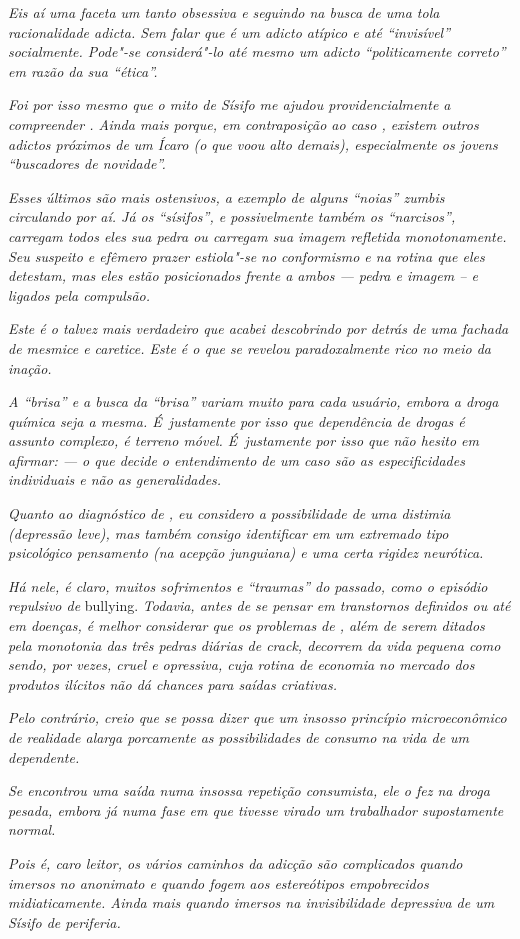 \emph{Eis aí uma faceta um tanto obsessiva e seguindo na busca de uma
tola racionalidade adicta. Sem falar que  é um adicto atípico e até
``invisível'' socialmente. Pode"-se considerá"-lo até mesmo um adicto
``politicamente correto'' em razão da sua ``ética''.}

\emph{Foi por isso mesmo que o mito de Sísifo me ajudou
providencialmente a compreender . Ainda mais porque, em contraposição
ao caso , existem outros adictos próximos de um Ícaro (o que voou alto
demais), especialmente os jovens ``buscadores de novidade''.}

\emph{Esses últimos são mais ostensivos, a exemplo de alguns ``noias''
zumbis circulando por aí. Já os ``sísifos'', e possivelmente também os
``narcisos'', carregam todos eles sua pedra ou carregam sua imagem
refletida monotonamente. Seu suspeito e efêmero prazer estiola"-se no
conformismo e na rotina que eles detestam, mas eles estão posicionados
frente a ambos --- pedra e imagem -- e ligados pela compulsão.}

\emph{Este é o  talvez mais verdadeiro que acabei descobrindo por
detrás de uma fachada de mesmice e caretice. Este é o  que se revelou
paradoxalmente rico no meio da inação.}

\emph{A ``brisa'' e a busca da ``brisa'' variam muito para cada usuário,
embora a droga química seja a mesma. É~justamente por isso que
dependência de drogas é assunto complexo, é terreno móvel. É~justamente
por isso que não hesito em afirmar: --- o que decide o entendimento de
um caso são as especificidades individuais e não as generalidades.}

\emph{Quanto ao diagnóstico de , eu considero a possibilidade de uma
distimia (depressão leve), mas também consigo identificar em  um
extremado tipo psicológico pensamento (na acepção junguiana) e uma certa
rigidez neurótica.}

\emph{Há nele, é claro, muitos sofrimentos e ``traumas'' do passado,
como o episódio repulsivo de} bullying. \emph{Todavia, antes de se pensar em
transtornos definidos ou até em doenças, é melhor considerar que os
problemas de , além de serem ditados pela monotonia das três pedras
diárias de crack, decorrem da vida pequena como sendo, por vezes, cruel
e opressiva, cuja rotina de economia no mercado dos produtos ilícitos
não dá chances para saídas criativas.}

\emph{Pelo contrário, creio que se possa dizer que um insosso princípio
microeconômico de realidade alarga porcamente as possibilidades de
consumo na vida de um dependente.}

\emph{Se  encontrou uma saída numa insossa repetição consumista, ele o
fez na droga pesada, embora já numa fase em que tivesse virado um
trabalhador supostamente normal.}

\emph{Pois é, caro leitor, os vários caminhos da adicção são complicados
quando imersos no anonimato e quando fogem aos estereótipos empobrecidos
midiaticamente. Ainda mais quando imersos na invisibilidade depressiva
de um Sísifo de periferia.}
\endgroup